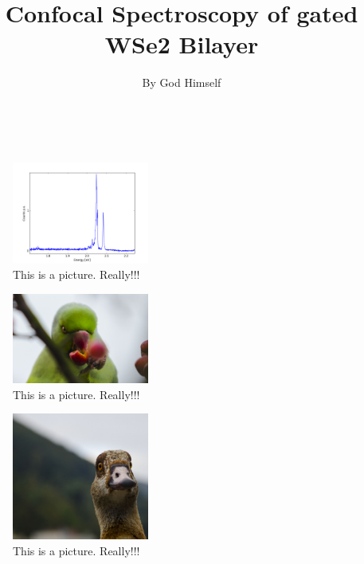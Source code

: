 \documentclass[english]{scrartcl}
\title{Confocal Spectroscopy of gated WSe2 Bilayer}
\author{By God Himself}
\date{\DTMdate{2017-11-16}}
\begin{document}
\maketitle
{}\\
\begin{figure}[h]
\includegraphics[width=0.4\textwidth]{Ex.png}
\caption{This is a picture. Really!!!}
\end{figure}
\begin{figure}[h]
\includegraphics[width=0.4\textwidth]{birdyboese.JPG}
\caption{This is a picture. Really!!!}
\end{figure}
\begin{figure}[h]
\includegraphics[width=0.4\textwidth]{ducktales.JPG}
\caption{This is a picture. Really!!!}
\end{figure}
\end{document}
